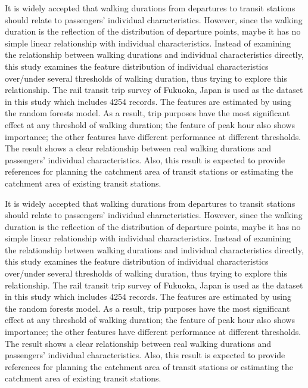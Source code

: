 \documentclass[12pt, twoside, a4paper]{book} %
\begin{document}








%
%

\backmatter
\setlength{\parskip}{0\baselineskip} %
\appendix


It is widely accepted that walking durations from departures to transit stations should relate to passengers' individual characteristics. However, since the walking duration is the reflection of the distribution of departure points, maybe it has no simple linear relationship with individual characteristics. Instead of examining the relationship between walking durations and individual characteristics directly, this study examines the feature distribution of individual characteristics over/under several thresholds of walking duration, thus trying to explore this relationship. The rail transit trip survey of Fukuoka, Japan is used as the dataset in this study which includes 4254 records. The features are estimated by using the random forests model. As a result, trip purposes have the most significant effect at any threshold of walking duration; the feature of peak hour also shows importance; the other features have different performance at different thresholds. The result shows a clear relationship between real walking durations and passengers' individual characteristics. Also, this result is expected to provide references for planning the catchment area of transit stations or estimating the catchment area of existing transit stations.

It is widely accepted that walking durations from departures to transit stations should relate to passengers' individual characteristics. However, since the walking duration is the reflection of the distribution of departure points, maybe it has no simple linear relationship with individual characteristics. Instead of examining the relationship between walking durations and individual characteristics directly, this study examines the feature distribution of individual characteristics over/under several thresholds of walking duration, thus trying to explore this relationship. The rail transit trip survey of Fukuoka, Japan is used as the dataset in this study which includes 4254 records. The features are estimated by using the random forests model. As a result, trip purposes have the most significant effect at any threshold of walking duration; the feature of peak hour also shows importance; the other features have different performance at different thresholds. The result shows a clear relationship between real walking durations and passengers' individual characteristics. Also, this result is expected to provide references for planning the catchment area of transit stations or estimating the catchment area of existing transit stations.
\end{document}
